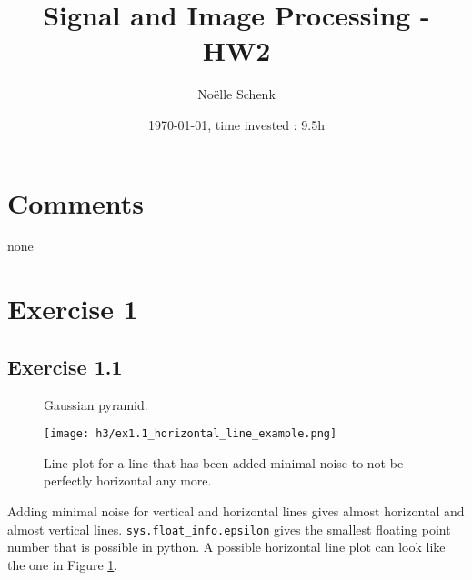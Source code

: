\documentclass[a4paper,8pt]{extarticle}\usepackage[]{graphicx}\usepackage[]{color}
\title{Signal and Image Processing - HW2}
\author{Noëlle Schenk}
\date{\today, time invested : 9.5h}
\begin{document}
\maketitle
\section{Comments}
none

\section{Exercise 1}
\subsection{Exercise 1.1}

\begin{figure}
  \caption{Gaussian pyramid.}
  \centering
    \texttt{[image: h3/ex1.1\_horizontal\_line\_example.png]}
  \label{fig:horizontal}
  \caption{Line plot for a line that has been added minimal noise to not be perfectly horizontal any more.}
\end{figure}

Adding minimal noise for vertical and horizontal lines gives almost horizontal and almost vertical lines. \texttt{sys.float_info.epsilon} gives the smallest floating point number that is possible in python. A possible horizontal line plot can look like the one in Figure \ref{fig:horizontal}. 




\end{document}
